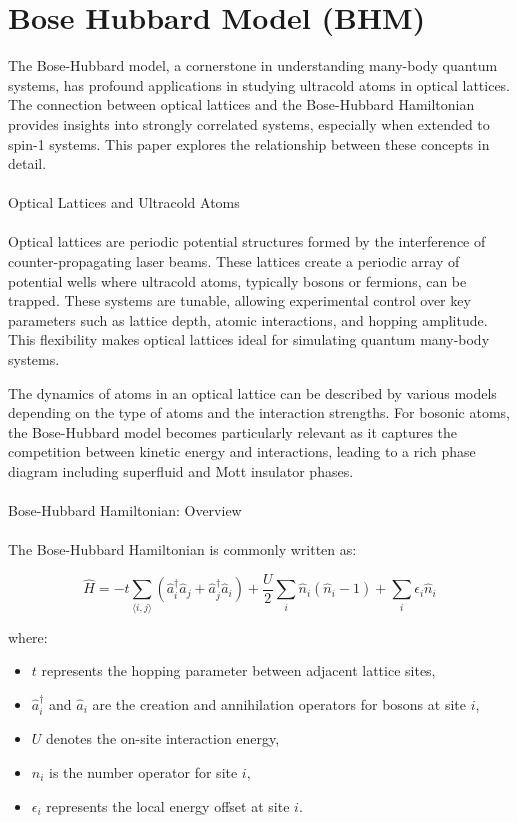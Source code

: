 \chapter{Bose Hubbard Model (BHM)}
The Bose-Hubbard model, a cornerstone in understanding many-body quantum systems, has profound applications in studying ultracold atoms in optical lattices. The connection between optical lattices and the Bose-Hubbard Hamiltonian provides insights into strongly correlated systems, especially when extended to spin-1 systems. This paper explores the relationship between these concepts in detail. \\ \\
\textcolor{myred}{Optical Lattices and Ultracold Atoms} \\ \\
Optical lattices are periodic potential structures formed by the interference of counter-propagating laser beams. These lattices create a periodic array of potential wells where ultracold atoms, typically bosons or fermions, can be trapped. These systems are tunable, allowing experimental control over key parameters such as lattice depth, atomic interactions, and hopping amplitude. This flexibility makes optical lattices ideal for simulating quantum many-body systems.

The dynamics of atoms in an optical lattice can be described by various models depending on the type of atoms and the interaction strengths. For bosonic atoms, the Bose-Hubbard model becomes particularly relevant as it captures the competition between kinetic energy and interactions, leading to a rich phase diagram including superfluid and Mott insulator phases. \\ \\
\textcolor{myred}{Bose-Hubbard Hamiltonian: Overview} \\ \\
The Bose-Hubbard Hamiltonian is commonly written as:

\begin{equation}
\hat{H} = -t \sum_{\langle i,j \rangle} (\hat{a}_i^\dagger \hat{a}_j + \hat{a}_j^\dagger \hat{a}_i) + \frac{U}{2} \sum_i \hat{n}_i (\hat{n}_i - 1) + \sum_i \epsilon_i \hat{n}_i
\end{equation}

where:
\begin{itemize}
    \item $t$ represents the hopping parameter between adjacent lattice sites,
    \item $\hat{a}_i^\dagger$ and $\hat{a}_i$ are the creation and annihilation operators for bosons at site $i$,
    \item $U$ denotes the on-site interaction energy,
    \item $\hat{n}_i$ is the number operator for site $i$,
    \item $\epsilon_i$ represents the local energy offset at site $i$.
\end{itemize}

